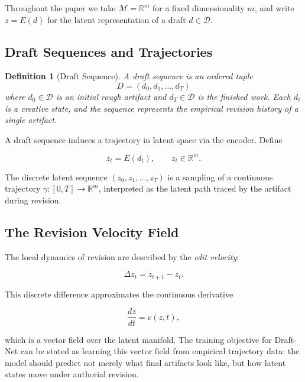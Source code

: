 \documentclass[12pt,a4paper]{article}
\theoremstyle{draftthm}
\newtheorem{definition}{Definition}[section]
\newcommand{\D}{\mathcal{D}}
\newcommand{\Lat}{\mathbb{R}^{m}}
\newcommand{\traj}{\gamma}
\newcommand{\enc}{E}
\newcommand{\dz}{\Delta z}
\begin{document}
Throughout the paper we take $\mathcal{M} = \Lat$ for a fixed dimensionality $m$, and write $z = \enc(d)$ for the latent representation of a draft $d \in \D$.

\subsection{Draft Sequences and Trajectories}

\begin{definition}[Draft Sequence]
  A \emph{draft sequence} is an ordered tuple
  \begin{equation}
    D = (d_0, d_1, \dots, d_T)
  \end{equation}
  where $d_0 \in \D$ is an initial rough artifact and $d_T \in \D$ is the finished work. Each $d_t$ is a creative state, and the sequence represents the empirical revision history of a single artifact.
\end{definition}

A draft sequence induces a trajectory in latent space via the encoder. Define

\begin{equation}
  z_t = \enc(d_t), \qquad z_t \in \Lat.
\end{equation}

The discrete latent sequence $(z_0, z_1, \dots, z_T)$ is a sampling of a continuous trajectory $\traj: [0,T] \to \Lat$, interpreted as the latent path traced by the artifact during revision.

\subsection{The Revision Velocity Field}

The local dynamics of revision are described by the \emph{edit velocity}:

\begin{equation}
  \dz_t = z_{t+1} - z_t.
\end{equation}

This discrete difference approximates the continuous derivative

\begin{equation}
  \frac{dz}{dt} = v(z, t),
\end{equation}

which is a vector field over the latent manifold. The training objective for Draft-Net can be stated as learning this vector field from empirical trajectory data: the model should predict not merely what final artifacts look like, but how latent states move under authorial revision.
\end{document}
